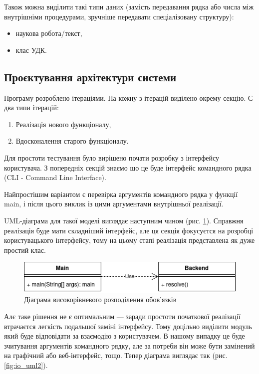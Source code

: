 \documentclass[14pt]{extarticle}
\begin{document}
  Також можна виділити такі типи даних (замість передавання рядка або числа між внутрішніми процедурами, зручніше передавати спеціалізовану структуру):
  \begin{itemize}[labelindent=\dimexpr{}\relax, leftmargin=*]
    \item наукова робота/текст,
    \item клас УДК.
  \end{itemize}

  \subsection{Проєктування архітектури системи}
  Програму розроблено ітераціями. На кожну з ітерацій виділено окрему секцію. Є два типи ітерацій:
  \begin{enumerate}[labelindent=\dimexpr\parindent*2\relax, leftmargin=*]
    \item Реалізація нового функціоналу,
    \item Вдосконалення старого функціоналу.
  \end{enumerate}
  Для простоти тестування було вирішено почати розробку з інтерфейсу користувача.
  З попередніх секцій знаємо що це буде інтерфейс командного рядка
  (CLI - Command Line Interface).

  Найпростішим варіантом
  є перевірка аргументів командного рядка у функції main,
  і після цього виклик із цими аргументами внутрішньої реалізації.

  UML-діаграма для такої моделі виглядає наступним чином
  (рис. \ref{fig:io_uml1}).
  Справжня реалізація буде мати складніший інтерфейс,
  але ця секція фокусуєтся на розробці користувацького інтерфейсу,
  тому на цьому єтапі реалізація представлена як дуже простий клас.

  \begin{figure}[H]
    \centering
    \includegraphics{io_uml1.drawio.png}    
    \caption{Діаграма високорівневого розподілення обов'язків}
    \label{fig:io_uml1}
  \end{figure}

  Алє таке рішення не є оптимальним ---
  заради простоти початкової реалізації
  втрачаєтся легкість подальшої заміні інтерфейсу.
  Тому доцільно виділити модуль який буде відповідати
  за взаємодію з користувачем.
  В нашому випадку це буде зчитування аргументів командного рядку,
  але за потреби він може бути замінений на графічний або веб-інтерфейс, тощо.
  Тепер діаграма виглядає так (рис. \ref{fig:io_uml2}).
\end{document}

